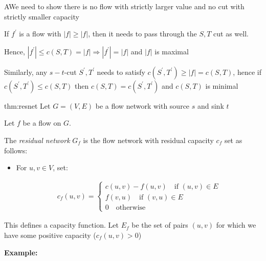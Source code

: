 \par\bigskip
\begin{prf}
  AWe need to show there is no flow with strictly larger value and no cut with strictly smaller capacity
  \par\bigskip
  \noindent If $f^{\prime}$ is a flow with $\left|f\right|\geq\left|f\right|$, then it needs to pass through the $S,T$ cut as well.
  \par\bigskip
  \noindent Hence, $\left|f^{\prime}\right|\leq c(S,T) = \left|f\right|\Rightarrow \left|f^{\prime}\right| = \left|f\right|$ and $\left|f\right|$ is maximal
  \par\bigskip
  \noindent Similarly, any $s-t$-cut $S^{\prime},T^{\prime}$ needs to satisfy $c(S^{\prime},T^{\prime})\geq \left|f\right| = c(S,T)$, hence if $c(S^{\prime},T^{\prime})\leq c(S,T)$ then $c(S,T) = c(S^{\prime},T^{\prime})$ and $c(S,T)$ is minimal
\end{prf}
\par\bigskip
\begin{theo}{thm:resnet}
  Let $G = (V,E)$ be a flow network with source $s$ and sink $t$
  \par\bigskip
  \noindent Let $f$ be a flow on $G$.
  \par\bigskip
  \noindent The \textit{residual network} $G_f$ is the flow network with residual capacity $c_f$ set as follows:\par
  \begin{itemize}
    \item For $u,v\in V$, set:\par
      \begin{equation*}
        \begin{gathered}
          c_f(u,v) = \begin{cases}c(u,v)-f(u,v)\quad\text{if } (u,v)\in E\\f(v,u)\quad\text{if } (v,u)\in E\\0\quad\text{otherwise}\end{cases}
        \end{gathered}
      \end{equation*}
  \end{itemize}
\end{theo}
\par\bigskip
\noindent This defines a capacity function. Let $E_f$ be the set of pairs $(u,v)$ for which we have some positive capacity ($c_f(u,v)>0$) 
\par\bigskip
\noindent\textbf{Example:}\par
